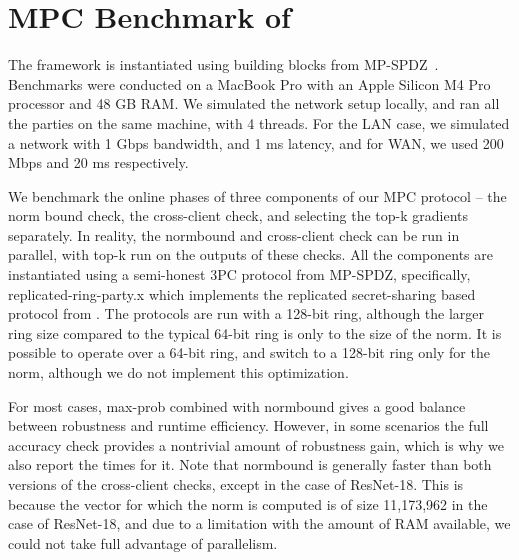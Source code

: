\section{MPC Benchmark of \ours}
\label{app:mpc-benchmark}




 The framework is instantiated using building blocks from MP-SPDZ~\cite{CCS:Keller20}. Benchmarks were conducted on a MacBook Pro with an Apple Silicon M4 Pro processor and 48 GB RAM. We simulated the network setup locally, and ran all the parties on the same machine, with 4 threads. For the LAN case, we simulated a network with 1 Gbps bandwidth, and 1 ms latency, and for WAN, we used 200 Mbps and 20 ms respectively.

We benchmark the online phases of three components of our MPC protocol -- the norm bound check, the cross-client check, and selecting the top-k gradients separately. In reality, the normbound and cross-client check can be run in parallel, with top-k run on the outputs of these checks. All the components are instantiated using a semi-honest 3PC protocol from MP-SPDZ, specifically, replicated-ring-party.x which implements the replicated secret-sharing based protocol from \cite{CCS:AFLNO16}. The protocols are run with a 128-bit ring, although the larger ring size compared to the typical 64-bit ring is only to the size of the norm. It is possible to operate over a 64-bit ring, and switch to a 128-bit ring only for the norm, although we do not implement this optimization. 

For most cases, max-prob combined with normbound gives a good balance between robustness and runtime efficiency. However, in some scenarios the full accuracy check provides a nontrivial amount of robustness gain, which is why we also report the times for it. Note that normbound is generally faster than both versions of the cross-client checks, except in the case of ResNet-18. This is because the vector for which the norm is computed is of size 11,173,962 in the case of ResNet-18, and due to a limitation with the amount of RAM available, we could not take full advantage of parallelism.

